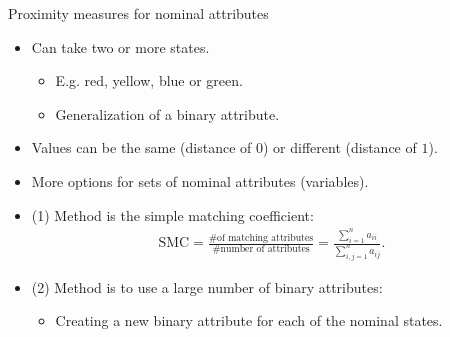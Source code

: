 \documentclass[aspectratio=169,t]{beamer}
\begin{document}
  { 
    \begin{frame}{Proximity measures for nominal attributes}
    \begin{itemize}
      \item Can take two or more states.
      \begin{itemize}
        \item E.g. red, yellow, blue or green.
        \item Generalization of a binary attribute.
      \end{itemize}
      \item Values can be the same (distance of $0$) or different (distance of $1$).
      \item More options for sets of nominal attributes (variables).
      \item (1) Method is the simple matching coefficient:
      \begin{align}
        \text{SMC} = \frac{\# \text{of matching attributes}}{\# \text{number of attributes}} = \frac{\sum\limits_{i=1}^{n} a_{ii}}{\sum\limits_{i,j=1}^{n}a_{ij}}.
      \end{align}
      \item (2) Method is to use a large number of binary attributes:
      \begin{itemize}
        \item Creating a new binary attribute for each of the nominal states.
      \end{itemize}
    \end{itemize}
    \end{frame}
  }
\end{document}
